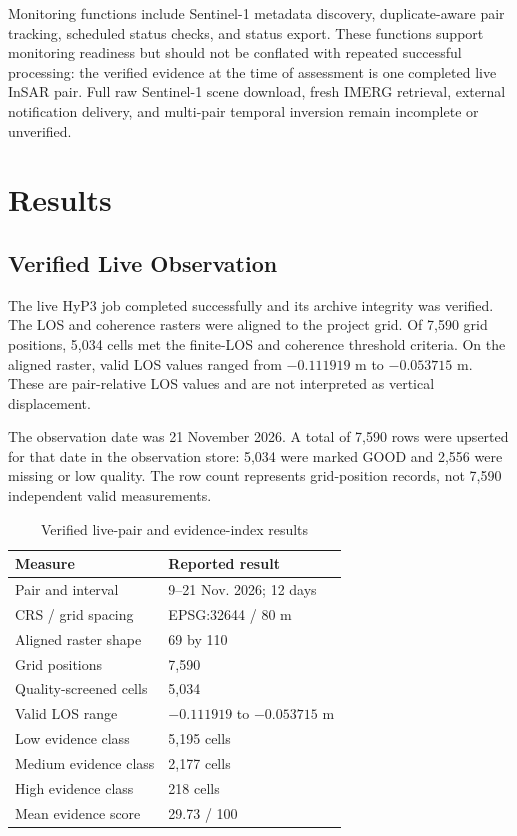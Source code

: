 \documentclass[conference]{IEEEtran}
\begin{document}
Monitoring functions include Sentinel-1 metadata discovery, duplicate-aware
pair tracking, scheduled status checks, and status export. These functions
support monitoring readiness but should not be conflated with repeated
successful processing: the verified evidence at the time of assessment is
one completed live InSAR pair. Full raw Sentinel-1 scene download, fresh
IMERG retrieval, external notification delivery, and multi-pair temporal
inversion remain incomplete or unverified.

\section{Results}
\subsection{Verified Live Observation}
The live HyP3 job completed successfully and its archive integrity was
verified. The LOS and coherence rasters were aligned to the project grid.
Of 7,590 grid positions, 5,034 cells met the finite-LOS and coherence
threshold criteria. On the aligned raster, valid LOS values ranged from
$-0.111919$ m to $-0.053715$ m. These are pair-relative LOS values and are
not interpreted as vertical displacement.

The observation date was 21 November 2026. A total of 7,590 rows were
upserted for that date in the observation store: 5,034 were marked GOOD and
2,556 were missing or low quality. The row count represents grid-position
records, not 7,590 independent valid measurements.

\begin{table}[t]
\caption{Verified live-pair and evidence-index results}
\label{tab:live}
\centering
\footnotesize
\begin{tabular}{p{}p{}}
\toprule
\textbf{Measure} & \textbf{Reported result}\\
\midrule
Pair and interval & 9--21 Nov. 2026; 12 days\\
CRS / grid spacing & EPSG:32644 / 80 m\\
Aligned raster shape & 69 by 110\\
Grid positions & 7,590\\
Quality-screened cells & 5,034\\
Valid LOS range & $-0.111919$ to $-0.053715$ m\\
Low evidence class & 5,195 cells\\
Medium evidence class & 2,177 cells\\
High evidence class & 218 cells\\
Mean evidence score & 29.73 / 100\\
\bottomrule
\end{tabular}
\end{table}
\end{document}
